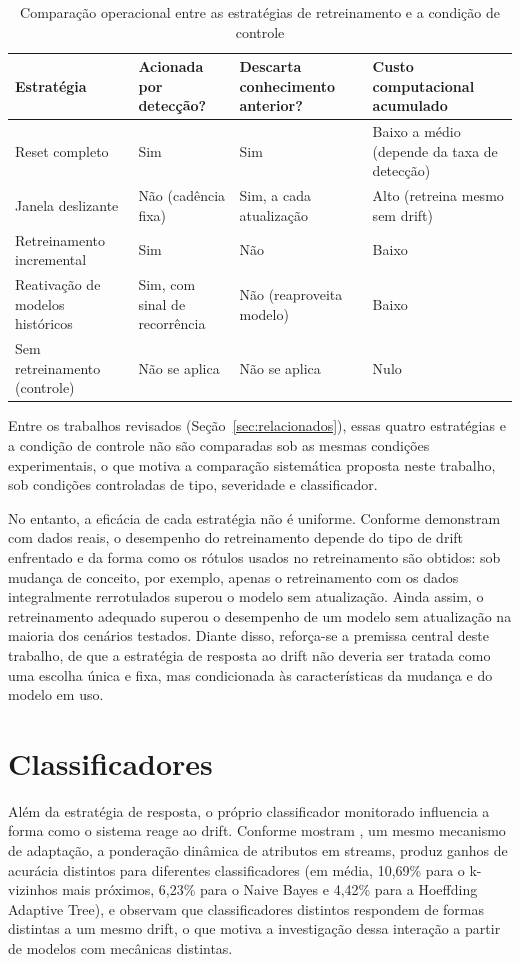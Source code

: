 \begin{table}[h]
\centering
\caption{Comparação operacional entre as estratégias de retreinamento e a
condição de controle}
\label{tab:estrategias}
\begin{tabular}{p{2.8cm}p{2.6cm}p{2.8cm}p{2.8cm}}
\toprule
\textbf{Estratégia} & \textbf{Acionada por detecção?} & \textbf{Descarta
conhecimento anterior?} & \textbf{Custo computacional acumulado} \\
\midrule
Reset completo & Sim & Sim & Baixo a médio (depende da taxa de detecção) \\
Janela deslizante & Não (cadência fixa) & Sim, a cada atualização & Alto
(retreina mesmo sem drift) \\
Retreinamento incremental & Sim & Não & Baixo \\
Reativação de modelos históricos & Sim, com sinal de recorrência & Não
(reaproveita modelo) & Baixo \\
Sem retreinamento (controle) & Não se aplica & Não se aplica & Nulo \\
\bottomrule
\end{tabular}
\end{table}

Entre os trabalhos revisados (Seção~\ref{sec:relacionados}), essas quatro
estratégias e a condição de controle não são comparadas sob as mesmas
condições experimentais, o que motiva a comparação sistemática proposta
neste trabalho, sob condições controladas de tipo, severidade e
classificador.

No entanto, a eficácia de cada estratégia não é uniforme. Conforme demonstram
 com dados reais, o desempenho do retreinamento depende
do tipo de drift enfrentado e da forma como os rótulos usados no retreinamento
são obtidos: sob mudança de conceito, por exemplo, apenas o retreinamento com
os dados integralmente rerrotulados superou o modelo sem atualização. Ainda
assim, o retreinamento adequado superou o desempenho de um modelo sem
atualização na maioria dos cenários testados. Diante disso, reforça-se a
premissa central deste trabalho, de que a estratégia de resposta ao drift não
deveria ser tratada como uma escolha única e fixa, mas condicionada às
características da mudança e do modelo em uso.

\section{Classificadores}
\label{sec:classificadores}
Além da estratégia de resposta, o próprio classificador monitorado influencia
a forma como o sistema reage ao drift. Conforme mostram
, um mesmo mecanismo de adaptação, a ponderação
dinâmica de atributos em streams, produz ganhos de acurácia distintos para
diferentes classificadores (em média, 10,69\% para o k-vizinhos mais
próximos, 6,23\% para o Naive Bayes e 4,42\% para a Hoeffding Adaptive
Tree), e  observam que classificadores distintos
respondem de formas distintas a um mesmo drift, o que motiva a investigação
dessa interação a partir de modelos com mecânicas distintas.

